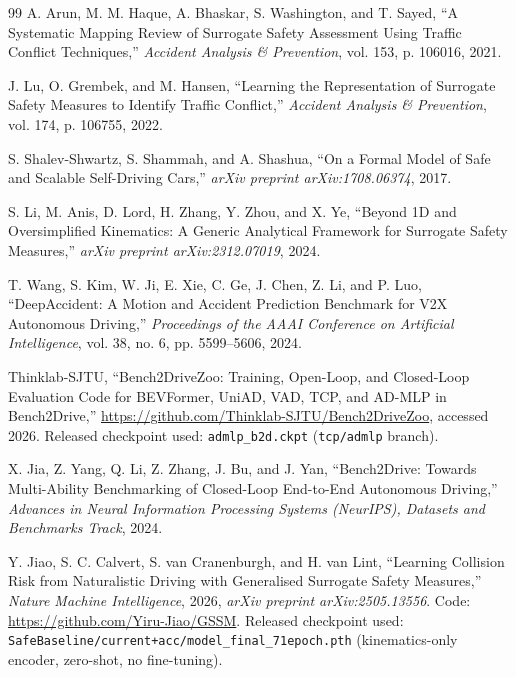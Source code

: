 \documentclass[letterpaper, 10 pt, conference]{ieeeconf}  %
\begin{document}
\begin{thebibliography}{99}
A. Arun, M. M. Haque, A. Bhaskar, S. Washington, and T. Sayed,
\newblock ``A Systematic Mapping Review of Surrogate Safety Assessment Using Traffic Conflict Techniques,''
\newblock \emph{Accident Analysis \& Prevention}, vol. 153, p. 106016, 2021.

J. Lu, O. Grembek, and M. Hansen,
\newblock ``Learning the Representation of Surrogate Safety Measures to Identify Traffic Conflict,''
\newblock \emph{Accident Analysis \& Prevention}, vol. 174, p. 106755, 2022.

S. Shalev-Shwartz, S. Shammah, and A. Shashua,
\newblock ``On a Formal Model of Safe and Scalable Self-Driving Cars,''
\newblock \emph{arXiv preprint arXiv:1708.06374}, 2017.

S. Li, M. Anis, D. Lord, H. Zhang, Y. Zhou, and X. Ye,
\newblock ``Beyond 1D and Oversimplified Kinematics: A Generic Analytical Framework for Surrogate Safety Measures,''
\newblock \emph{arXiv preprint arXiv:2312.07019}, 2024.

T. Wang, S. Kim, W. Ji, E. Xie, C. Ge, J. Chen, Z. Li, and P. Luo,
\newblock ``DeepAccident: A Motion and Accident Prediction Benchmark for V2X Autonomous Driving,''
\newblock \emph{Proceedings of the AAAI Conference on Artificial Intelligence}, vol. 38, no. 6, pp. 5599--5606, 2024.

Thinklab-SJTU,
\newblock ``Bench2DriveZoo: Training, Open-Loop, and Closed-Loop Evaluation Code for BEVFormer, UniAD, VAD, TCP, and AD-MLP in Bench2Drive,''
\newblock \url{https://github.com/Thinklab-SJTU/Bench2DriveZoo}, accessed 2026. Released checkpoint used: \texttt{admlp\_b2d.ckpt} (\texttt{tcp/admlp} branch).

X. Jia, Z. Yang, Q. Li, Z. Zhang, J. Bu, and J. Yan,
\newblock ``Bench2Drive: Towards Multi-Ability Benchmarking of Closed-Loop End-to-End Autonomous Driving,''
\newblock \emph{Advances in Neural Information Processing Systems (NeurIPS), Datasets and Benchmarks Track}, 2024.

Y. Jiao, S. C. Calvert, S. van Cranenburgh, and H. van Lint,
\newblock ``Learning Collision Risk from Naturalistic Driving with Generalised Surrogate Safety Measures,''
\newblock \emph{Nature Machine Intelligence}, 2026, \emph{arXiv preprint arXiv:2505.13556}. Code: \url{https://github.com/Yiru-Jiao/GSSM}. Released checkpoint used: \texttt{SafeBaseline/current+acc/model\_final\_71epoch.pth} (kinematics-only encoder, zero-shot, no fine-tuning).

\end{thebibliography}
\end{document}
